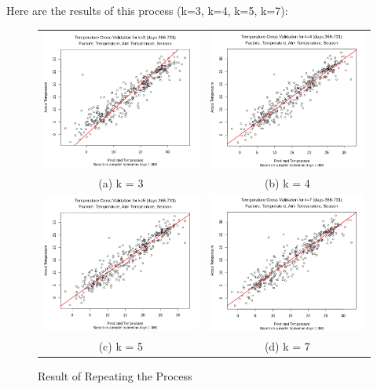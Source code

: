 \documentclass[12pt]{article}
\begin{document}
Here are the results of this process (k=3, k=4, k=5, k=7):
\begin{figure}[H]
\begin{tabular}{cc}
  \includegraphics[width=.5\linewidth]{tempxvalidk=3.png} &   \includegraphics[width=.5\linewidth]{tempxvalidk=4.png} \\
(a) k = 3 & (b) k = 4 \\[6pt]
 \includegraphics[width=.5\linewidth]{tempxvalidk=5.png} &   \includegraphics[width=.5\linewidth]{tempxvalidk=7.png} \\
(c) k = 5 & (d) k = 7 \\[6pt]
\end{tabular}
\caption{Result of Repeating the Process}
\label{tempcomparison}
\end{figure}
\end{document}
